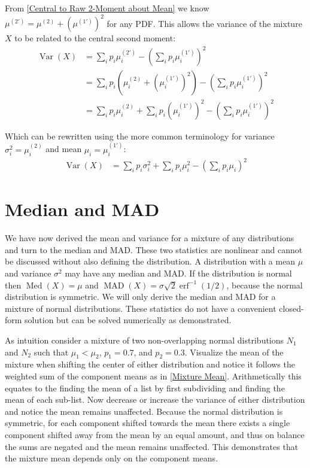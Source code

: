 \documentclass{article}
\DeclareMathOperator\erf{erf}
\DeclareMathOperator\Var{Var}
\DeclareMathOperator\Med{Med}
\DeclareMathOperator\MAD{MAD}
\begin{document}
From \ref{Central to Raw 2-Moment about Mean} we know $\mu^{(2')} = \mu^{(2)} + \left( \mu^{(1')} \right)^2$ for any PDF. This allows the variance of the mixture $X$ to be related to the central second moment:
%
\begin{equation}\label{Mixture Variance}
\begin{split}
\Var(X) & = \sum_i p_i \mu^{(2')}_i
    - \left( \sum_i p_i \mu^{(1')}_i \right)^2 \\
& = \sum_i p_i \left( \mu^{(2)}_i + \left( \mu^{(1')}_i \right)^2 \right)
    - \left( \sum_i p_i \mu^{(1')}_i \right)^2 \\
& = \sum_i p_i \mu^{(2)}_i
    + \sum_i p_i \left( \mu^{(1')}_i \right)^2
    - \left( \sum_i p_i \mu^{(1')}_i \right)^2
\end{split}
\end{equation}

Which can be rewritten using the more common terminology for variance $\sigma_i^2 = \mu^{(2)}_i$ and mean $\mu_i = \mu^{(1')}_i$:
%
\begin{equation}\label{Mixture Variance Common}
\begin{split}
\Var(X) & = \sum_i p_i \sigma_i^2
    + \sum_i p_i \mu_i^2
    - \left( \sum_i p_i \mu_i \right)^2
\end{split}
\end{equation}

\section{Median and MAD}

We have now derived the mean and variance for a mixture of any distributions and turn to the median and MAD. These two statistics are nonlinear and cannot be discussed without also defining the distribution. A distribution with a mean $\mu$ and variance $\sigma^2$ may have any median and MAD. If the distribution is normal then $\Med(X) = \mu$ and $\MAD(X) = \sigma\sqrt{2}\erf^{-1}(1/2)$, because the normal distribution is symmetric. We will only derive the median and MAD for a mixture of normal distributions. These statistics do not have a convenient closed-form solution but can be solved numerically as demonstrated.

As intuition consider a mixture of two non-overlapping normal distributions $N_1$ and $N_2$ such that $\mu_1 < \mu_2$, $p_1 = 0.7$, and $p_2 = 0.3$. Visualize the mean of the mixture when shifting the center of either distribution and notice it follows the weighted sum of the component means as in \ref{Mixture Mean}. Arithmetically this equates to the finding the mean of a list by first subdividing and finding the mean of each sub-list. Now decrease or increase the variance of either distribution and notice the mean remains unaffected. Because the normal distribution is symmetric, for each component shifted towards the mean there exists a single component shifted away from the mean by an equal amount, and thus on balance the sums are negated and the mean remains unaffected. This demonstrates that the mixture mean depends only on the component means.
\end{document}
